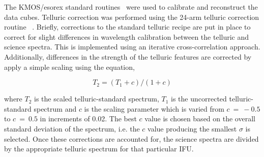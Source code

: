 \documentclass[useAMS,usenatbib]{mn2e}
\begin{document}
The KMOS/esorex standard routines~\citep[SPARK;][]{2013A&A...558A..56D} were used to calibrate and reconstruct the data cubes.
Telluric correction was performed using the 24-arm telluric correction routine
~\citep[described in detail by][]{2015ApJ...803...14P}.
Briefly, corrections to the standard telluric recipe are put in place to correct for slight differences in wavelength calibration between the telluric and science spectra.
This is implemented using an iterative cross-correlation approach.
Additionally, differences in the strength of the telluric features are corrected by apply a simple scaling using the equation,

\begin{equation}
  T_{2} = (T_{1} + c) / (1 + c)
\end{equation}

\noindent where $T_{2}$ is the scaled telluric-standard spectrum, $T_{1}$ is the uncorrected telluric-standard spectrum and $c$ is the scaling parameter which is varied from $c~=~-0.5$ to $c~=~0.5$ in increments of 0.02.
The best $c$ value is chosen based on the overall standard deviation of the spectrum, i.e. the $c$ value producing the smallest $\sigma$ is selected.
Once these corrections are accounted for, the science spectra are divided by the appropriate telluric spectrum for that particular IFU.
\end{document}
